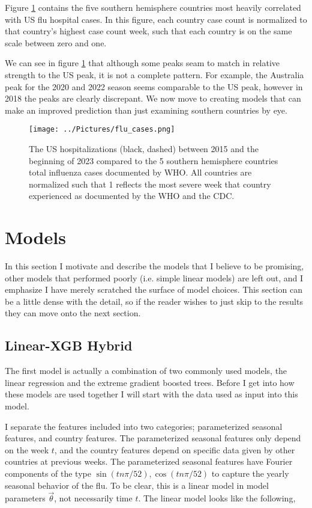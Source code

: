 \documentclass[12pt,a4paper,english]{article}
\begin{document}
	

Figure \ref{fig:so_cases} contains the five southern hemisphere countries most heavily correlated with US flu hospital cases. In this figure, each country case count is normalized to that country's highest case count week, such that each country is on the same scale between zero and one. 

We can see in figure \ref{fig:so_cases} that although some peaks seam to match in relative strength to the US peak, it is not a complete pattern. For example, the Australia peak for the 2020 and 2022 season seems comparable to the US peak, however in 2018 the peaks are clearly discrepant. We now move to creating models that can make an improved prediction than just examining southern countries by eye.

	\begin{figure}[h!]
		\begin{center}
		\texttt{[image: ../Pictures/flu\_cases.png]}
		\caption{The US hospitalizations (black, dashed) between 2015 and the beginning of 2023 compared to the 5 southern hemisphere countries total influenza cases documented by WHO. All countries are normalized such that 1 reflects the most severe week that country experienced as documented by the WHO and the CDC.}
		\end{center}
		\label{fig:so_cases}
	\end{figure}
\FloatBarrier
\section{Models}
In this section I motivate and describe the models that I believe to be promising, other models that performed poorly (i.e. simple linear models) are left out, and I emphasize I have merely scratched the surface of model choices. This section can be a little dense with the detail, so if the reader wishes to just skip to the results they can move onto the next section.
\subsection{Linear-XGB Hybrid}

The first model is actually a combination of two commonly used models, the linear regression and the extreme gradient boosted trees. Before I get into how these models are used together I will start with the data used as input into this model. 

I separate the features included into two categories; parameterized seasonal features, and country features. The parameterized seasonal features only depend on the week $t$, and the country features depend on specific data given by other countries at previous weeks. The parameterized seasonal features have Fourier components of the type $\sin(t n\pi/52),\cos(t n\pi/52)$ to capture the yearly seasonal behavior of the flu. To be clear, this is a linear model in model parameters $\vec{\theta}$, not necessarily time $t$. The linear model looks like the following,
\end{document}
